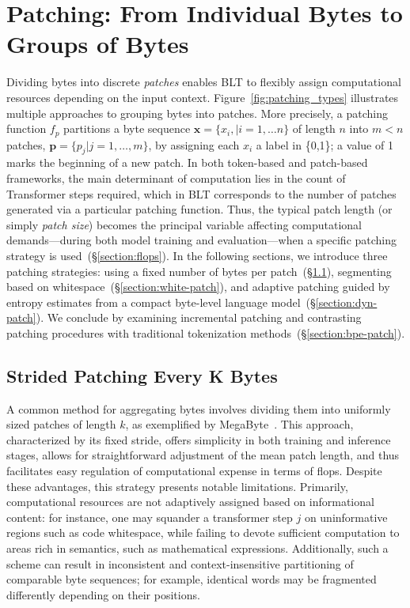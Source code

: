 \section{Patching: From Individual Bytes to Groups of Bytes}
\label{section:patching}

Dividing bytes into discrete \textit{patches} enables {\textsc BLT} to flexibly assign computational resources depending on the input context. Figure~\ref{fig:patching_types} illustrates multiple approaches to grouping bytes into patches. More precisely, a patching function $f_p$ partitions a byte sequence $\pmb{x}=\{x_i,|i=1,\ldots n\}$ of length $n$ into $m < n$ patches, $\pmb{p}=\{p_j|j=1,\ldots,m\}$, by assigning each $x_i$ a label in \{0,1\}; a value of 1 marks the beginning of a new patch. In both token-based and patch-based frameworks, the main determinant of computation lies in the count of Transformer steps required, which in {\textsc BLT} corresponds to the number of patches generated via a particular patching function. Thus, the typical patch length (or simply \textit{patch size}) becomes the principal variable affecting computational demands—during both model training and evaluation—when a specific patching strategy is used~(\S\ref{section:flops}).  
In the following sections, we introduce three patching strategies: using a fixed number of bytes per patch~(\S\ref{section:static-patch}), segmenting based on whitespace~(\S\ref{section:white-patch}), and adaptive patching guided by entropy estimates from a compact byte-level language model~(\S\ref{section:dyn-patch}). We conclude by examining incremental patching and contrasting patching procedures with traditional tokenization methods~(\S\ref{section:bpe-patch}).

\subsection{Strided Patching Every K Bytes}
\label{section:static-patch}

A common method for aggregating bytes involves dividing them into uniformly sized patches of length $k$, as exemplified by MegaByte~\citep{yu2023megabyte}. This approach, characterized by its fixed stride, offers simplicity in both training and inference stages, allows for straightforward adjustment of the mean patch length, and thus facilitates easy regulation of computational expense in terms of flops. Despite these advantages, this strategy presents notable limitations. Primarily, computational resources are not adaptively assigned based on informational content: for instance, one may squander a transformer step $j$ on uninformative regions such as code whitespace, while failing to devote sufficient computation to areas rich in semantics, such as mathematical expressions. Additionally, such a scheme can result in inconsistent and context-insensitive partitioning of comparable byte sequences; for example, identical words may be fragmented differently depending on their positions.

